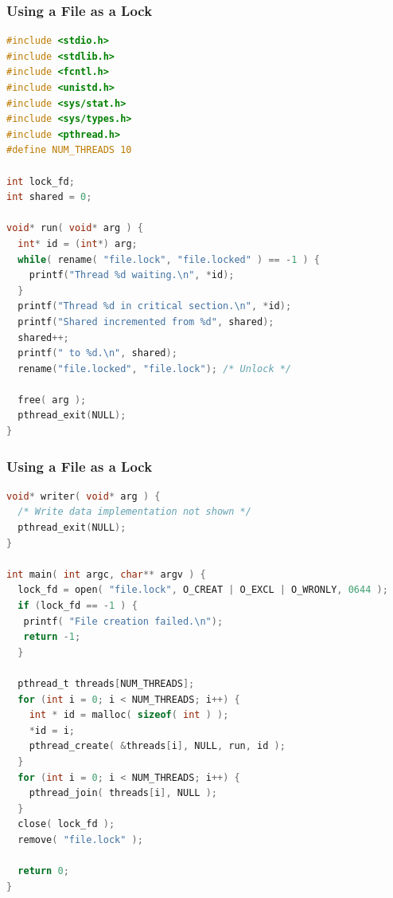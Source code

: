 \begin{frame}[fragile]
	\frametitle{Using a File as a Lock}
	\begin{lstlisting}[language=C]
#include <stdio.h>
#include <stdlib.h>
#include <fcntl.h>
#include <unistd.h>
#include <sys/stat.h>
#include <sys/types.h>
#include <pthread.h>
#define NUM_THREADS 10

int lock_fd;
int shared = 0;

void* run( void* arg ) {
  int* id = (int*) arg;
  while( rename( "file.lock", "file.locked" ) == -1 ) {
    printf("Thread %d waiting.\n", *id); 
  }
  printf("Thread %d in critical section.\n", *id);
  printf("Shared incremented from %d", shared);
  shared++;
  printf(" to %d.\n", shared);
  rename("file.locked", "file.lock"); /* Unlock */

  free( arg );
  pthread_exit(NULL);
}
\end{lstlisting}

\end{frame}

\begin{frame}[fragile]
	\frametitle{Using a File as a Lock}
	\begin{lstlisting}[language=C]
void* writer( void* arg ) {
  /* Write data implementation not shown */
  pthread_exit(NULL);
}

int main( int argc, char** argv ) {
  lock_fd = open( "file.lock", O_CREAT | O_EXCL | O_WRONLY, 0644 );
  if (lock_fd == -1 ) {
   printf( "File creation failed.\n");
   return -1;
  }

  pthread_t threads[NUM_THREADS];
  for (int i = 0; i < NUM_THREADS; i++) {
    int * id = malloc( sizeof( int ) );
    *id = i;
    pthread_create( &threads[i], NULL, run, id );
  }
  for (int i = 0; i < NUM_THREADS; i++) {
    pthread_join( threads[i], NULL );
  }
  close( lock_fd );
  remove( "file.lock" );

  return 0;
}
\end{lstlisting}
\end{frame}



